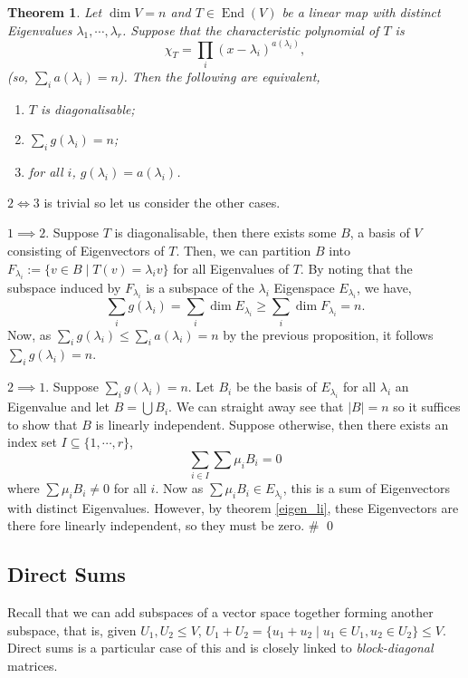 \documentclass[
]{article}
\newtheorem{theorem}{Theorem}
\theoremstyle{definition}
\begin{document}
\begin{theorem}
  Let \(\dim V = n\) and \(T \in \mathop{\mathrm{End}}(V)\) be a linear map with distinct 
  Eigenvalues \(\lambda_1, \cdots, \lambda_r\). Suppose that the characteristic 
  polynomial of \(T\) is 
  \[\chi_T = \prod_i (x - \lambda_i)^{a(\lambda_i)},\]
  (so, \(\sum_i a(\lambda_i) = n\)). Then the following are equivalent,
  \begin{enumerate}
    \item \(T\) is diagonalisable;
    \item \(\sum_i g(\lambda_i) = n\);
    \item for all \(i\), \(g(\lambda_i) = a(\lambda_i)\).
  \end{enumerate}
\end{theorem}
\proof

\(2 \iff 3\) is trivial so let us consider the other cases.

\(1 \implies 2\). Suppose \(T\) is diagonalisable, then there exists
some \(B\), a basis of \(V\) consisting of Eigenvectors of \(T\). Then,
we can partition \(B\) into
\(F_{\lambda_i} := \{v \in B \mid T(v) = \lambda_i v\}\) for all
Eigenvalues of \(T\). By noting that the subspace induced by
\(F_{\lambda_i}\) is a subspace of the \(\lambda_i\) Eigenspace
\(E_{\lambda_i}\), we have,
\[\sum_i g(\lambda_i) = \sum_i \dim E_{\lambda_i} \ge \sum_i \dim F_{\lambda_i} = n.\]
Now, as \(\sum_i g(\lambda_i) \le \sum_i a(\lambda_i) = n\) by the
previous proposition, it follows \(\sum_i g(\lambda_i) = n\).

\(2 \implies 1\). Suppose \(\sum_i g(\lambda_i) = n\). Let \(B_i\) be
the basis of \(E_{\lambda_i}\) for all \(\lambda_i\) an Eigenvalue and
let \(B = \bigcup B_i\). We can straight away see that
\(\left| B \right| = n\) so it suffices to show that \(B\) is linearly
independent. Suppose otherwise, then there exists an index set
\(I \subseteq \{1, \cdots, r\}\), \[\sum_{i \in I} \sum \mu_i B_i = 0\]
where \(\sum \mu_i B_i \neq 0\) for all \(i\). Now as
\(\sum \mu_i B_i \in E_{\lambda_i}\), this is a sum of Eigenvectors with
distinct Eigenvalues. However, by theorem \ref{eigen_li}, these
Eigenvectors are there fore linearly independent, so they must be zero.
\# \qed

\hypertarget{direct-sums}{%
\subsection{Direct Sums}\label{direct-sums}}

Recall that we can add subspaces of a vector space together forming
another subspace, that is, given \(U_1, U_2 \le V\),
\(U_1 + U_2 = \{u_1 + u_2 \mid u_1 \in U_1, u_2 \in U_2\} \le V\).
Direct sums is a particular case of this and is closely linked to
\emph{block-diagonal} matrices.
\end{document}
